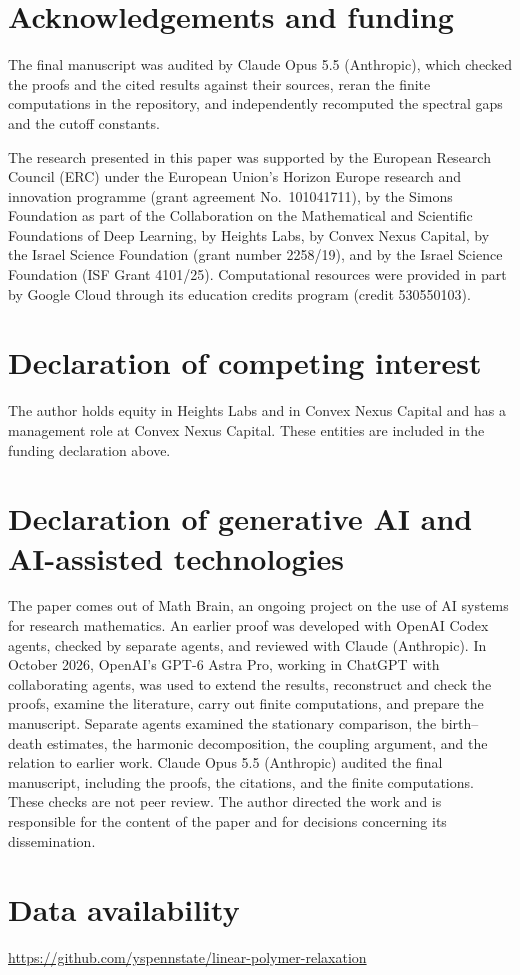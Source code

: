 \section*{Acknowledgements and funding}
The final manuscript was audited by Claude Opus 5.5 (Anthropic), which
checked the proofs and the cited results against their sources, reran the
finite computations in the repository, and independently recomputed the
spectral gaps and the cutoff constants.

The research presented in this paper was supported by the European Research
Council (ERC) under the European Union's Horizon Europe research and
innovation programme (grant agreement No.~101041711), by the Simons
Foundation as part of the Collaboration on the Mathematical and Scientific
Foundations of Deep Learning, by Heights Labs, by Convex Nexus Capital, by
the Israel Science Foundation (grant number 2258/19), and by the Israel
Science Foundation (ISF Grant 4101/25). Computational resources were
provided in part by Google Cloud through its education credits program
(credit 530550103).

\section*{Declaration of competing interest}
The author holds equity in Heights Labs and in Convex Nexus Capital and
has a management role at Convex Nexus Capital. These entities are included
in the funding declaration above.

\section*{Declaration of generative AI and AI-assisted technologies}
The paper comes out of Math Brain, an ongoing project on the use of AI systems for research mathematics. An earlier proof was developed with OpenAI Codex agents, checked by separate agents, and reviewed with Claude (Anthropic). In October 2026, OpenAI's GPT-6 Astra Pro, working in ChatGPT with collaborating agents, was used to extend the results, reconstruct and check the proofs, examine the literature, carry out finite computations, and prepare the manuscript. Separate agents examined the stationary comparison, the birth--death estimates, the harmonic decomposition, the coupling argument, and the relation to earlier work. Claude Opus 5.5 (Anthropic) audited the final manuscript, including the proofs, the citations, and the finite computations. These checks are not peer review. The author directed the work and is responsible for the content of the paper and for decisions concerning its dissemination.

\section*{Data availability}
\url{https://github.com/yspennstate/linear-polymer-relaxation}
